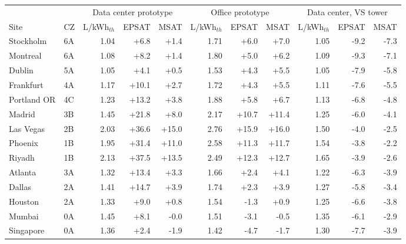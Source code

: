 \begin{tabular}{llrrrrrrrrr}
\toprule
 & & \multicolumn{3}{c}{Data center prototype} & \multicolumn{3}{c}{Office prototype} & \multicolumn{3}{c}{Data center, VS tower} \\
\cmidrule(lr){3-5}\cmidrule(lr){6-8}\cmidrule(lr){9-11}
Site & CZ & L/kWh$_{th}$ & EPSAT & MSAT & L/kWh$_{th}$ & EPSAT & MSAT & L/kWh$_{th}$ & EPSAT & MSAT \\
\midrule
Stockholm & 6A & 1.04 & +6.8 & +1.4 & 1.71 & +6.0 & +7.0 & 1.05 & -9.2 & -7.3 \\
Montreal & 6A & 1.08 & +8.2 & +1.4 & 1.80 & +5.0 & +6.2 & 1.09 & -9.3 & -7.1 \\
Dublin & 5A & 1.05 & +4.1 & +0.5 & 1.53 & +4.3 & +5.5 & 1.05 & -7.9 & -5.8 \\
Frankfurt & 4A & 1.17 & +10.1 & +2.7 & 1.72 & +4.3 & +5.5 & 1.11 & -7.6 & -5.5 \\
Portland OR & 4C & 1.23 & +13.2 & +3.8 & 1.88 & +5.8 & +6.7 & 1.13 & -6.8 & -4.8 \\
Madrid & 3B & 1.45 & +21.8 & +8.0 & 2.17 & +10.7 & +11.4 & 1.25 & -6.0 & -4.1 \\
Las Vegas & 2B & 2.03 & +36.6 & +15.0 & 2.76 & +15.9 & +16.0 & 1.50 & -4.0 & -2.5 \\
Phoenix & 1B & 1.95 & +31.4 & +11.0 & 2.58 & +11.3 & +11.7 & 1.54 & -3.8 & -2.2 \\
Riyadh & 1B & 2.13 & +37.5 & +13.5 & 2.49 & +12.3 & +12.7 & 1.65 & -3.9 & -2.6 \\
Atlanta & 3A & 1.32 & +13.4 & +3.3 & 1.66 & +2.4 & +4.1 & 1.22 & -6.3 & -3.9 \\
Dallas & 2A & 1.41 & +14.7 & +3.9 & 1.74 & +2.3 & +3.9 & 1.27 & -5.8 & -3.4 \\
Houston & 2A & 1.33 & +9.0 & +0.8 & 1.54 & -1.3 & +0.9 & 1.25 & -6.6 & -3.8 \\
Mumbai & 0A & 1.45 & +8.1 & -0.0 & 1.51 & -3.1 & -0.5 & 1.35 & -6.1 & -2.9 \\
Singapore & 0A & 1.36 & +2.4 & -1.9 & 1.42 & -4.7 & -1.7 & 1.30 & -7.7 & -3.9 \\
\bottomrule
\end{tabular}
